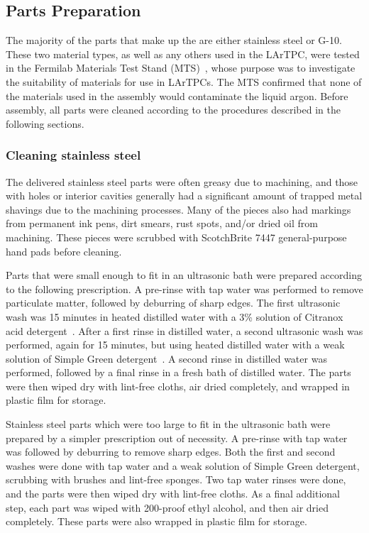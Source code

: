 \subsection{Parts Preparation}

The majority of the parts that make up the \lartpc are either stainless steel or G-10. These two material types, as well as any others used in the LArTPC, were tested in the Fermilab Materials Test Stand (MTS)~\cite{Rebel:2011-MTS}, whose purpose was to investigate the suitability of materials for use in LArTPCs.  The MTS confirmed that none of the materials used in the \lartpc assembly would contaminate the liquid argon.  Before assembly, all \lartpc parts were cleaned according to the procedures described in the following sections.

\subsubsection{Cleaning stainless steel}

The delivered stainless steel parts were often greasy due to machining, and those with holes or interior cavities generally had a significant amount of trapped metal shavings due to the machining processes. Many of the pieces also had markings from permanent ink pens, dirt smears, rust spots, and/or dried oil from machining. These pieces were scrubbed with ScotchBrite 7447 general-purpose hand pads before cleaning.

Parts that were small enough to fit in an ultrasonic bath were prepared according to the following prescription. A pre-rinse with tap water was performed to remove particulate matter, followed by deburring of sharp edges. The first ultrasonic wash was 15 minutes in heated distilled water with a 3\% solution of Citranox acid detergent~\cite{citranox}. After a first rinse in distilled water, a second ultrasonic wash was performed, again for 15 minutes, but using heated distilled water with a weak solution of Simple Green detergent~\cite{simplegreen}. A second rinse in distilled water was performed, followed by a final rinse in a fresh bath of distilled water. The parts were then wiped dry with lint-free cloths, air dried completely, and wrapped in plastic film for storage.

Stainless steel parts which were too large to fit in the ultrasonic bath were prepared by a simpler prescription out of necessity. A pre-rinse with tap water was followed by deburring to remove sharp edges. Both the first and second washes were done with tap water and a weak solution of Simple Green detergent, scrubbing with brushes and lint-free sponges. Two tap water rinses were done, and the parts were then wiped dry with lint-free cloths. As a final additional step, each part was wiped with 200-proof ethyl alcohol, and then air dried completely. These parts were also wrapped in plastic film for storage.

